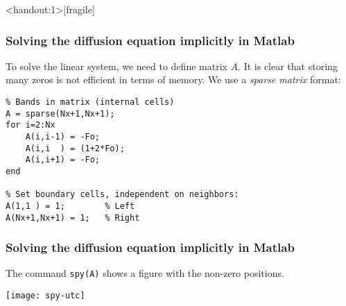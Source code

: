 \documentclass[11pt,table,final,fleqn,xcolor={usenames,dvipsnames,table}]{beamer}
\begin{document}
\begin{frame}<handout:1>[fragile]
  \frametitle{Solving the diffusion equation implicitly in Matlab}
  To solve the linear system, we need to define matrix $A$. It is clear that storing many zeros is not efficient in terms of memory. We use a \emph{sparse matrix} format:
  \begin{lstlisting}
% Bands in matrix (internal cells)
A = sparse(Nx+1,Nx+1);
for i=2:Nx
    A(i,i-1) = -Fo;
    A(i,i  ) = (1+2*Fo);
    A(i,i+1) = -Fo;
end

% Set boundary cells, independent on neighbors:
A(1,1 ) = 1;        % Left
A(Nx+1,Nx+1) = 1;   % Right
  \end{lstlisting}
\end{frame}

\begin{frame}[fragile]
  \frametitle{Solving the diffusion equation implicitly in Matlab}
  The command \lstinline$spy(A)$ shows a figure with the non-zero positions.
  \begin{center}
    \texttt{[image: spy-utc]}
  \end{center}
\end{frame}

\end{document}
